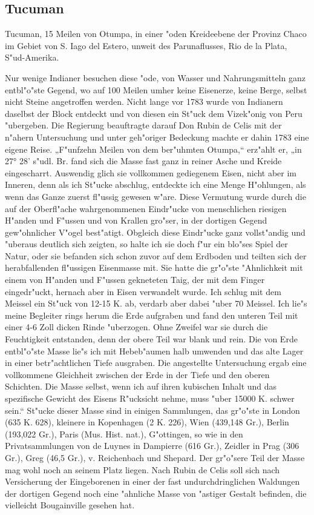 \documentclass[a4paper, 11pt, oneside]{article}
\begin{document}
\subsection{Tucuman}

Tucuman, 15 Meilen von Otumpa, in einer "oden Kreideebene
der Provinz Chaco im Gebiet von S. Iago del Estero, unweit des Parunaflusses, Rio de la Plata, S"ud-Amerika.

Nur wenige Indianer besuchen diese "ode, von Wasser und Nahrungsmitteln ganz entbl"o"ste Gegend, wo auf 100 Meilen umher keine Eisenerze, keine Berge, selbst nicht Steine angetroffen werden. Nicht lange vor 1783 wurde von Indianern daselbst der Block entdeckt und von diesen ein St"uck dem Vizek"onig von Peru "ubergeben. Die Regierung beauftragte darauf Don Rubin de Celis mit der n"ahern Untersuchung und unter geh"origer Bedeckung machte er dahin 1783 eine eigene Reise. „F"unfzehn Meilen von dem ber"uhmten Otumpa,“ erz"ahlt er, „in 27° 28' s"udl. Br. fand sich die Masse fast ganz in reiner Asche und Kreide eingescharrt. Auswendig glich sie vollkommen gediegenem Eisen, nicht aber im Inneren, denn als ich St"ucke abschlug, entdeckte ich eine Menge H"ohlungen, als wenn das Ganze zuerst fl"ussig gewesen w"are. Diese Vermutung wurde durch die auf der Oberfl"ache wahrgenommenen Eindr"ucke von menschlichen riesigen H"anden und F"ussen und von Krallen gro"ser, in der dortigen Gegend gew"ohnlicher V"ogel best"atigt. Obgleich diese Eindr"ucke ganz vollst"andig und "uberaus deutlich sich zeigten, so halte ich sie doch f"ur ein blo"ses Spiel der Natur, oder sie befanden sich schon zuvor auf dem Erdboden und teilten sich der herabfallenden fl"ussigen Eisenmasse mit. Sie hatte die gr"o"ste "Ahnlichkeit mit einem von H"anden und F"ussen gekneteten Taig, der mit dem Finger eingedr"uckt, hernach aber in Eisen verwandelt wurde. Ich schlug mit dem Meissel ein St"uck von 12-15 K. ab, verdarb aber dabei "uber 70 Meissel. Ich lie"s meine Begleiter rings herum die Erde aufgraben und fand den unteren Teil mit einer 4-6 Zoll dicken Rinde "uberzogen. Ohne Zweifel war sie durch die Feuchtigkeit entstanden, denn der obere Teil war blank und rein. Die von Erde entbl"o"ste Masse lie"s ich mit Hebeb"aumen halb umwenden und das alte Lager in einer betr"achtlichen Tiefe ausgraben. Die angestellte Untersuchung ergab eine vollkommene Gleichheit zwischen der Erde in der Tiefe und den oberen Schichten. Die Masse selbst, wenn ich auf ihren kubischen Inhalt und das spezifische Gewicht des Eisens R"ucksicht nehme, muss "uber 15000 K. schwer sein.“ St"ucke dieser Masse sind in einigen Sammlungen, das gr"o"ste in London (635 K. 628), kleinere in Kopenhagen (2 K. 226), Wien (439,148 Gr.), Berlin (193,022 Gr.), Paris (Mus. Hist. nat.), G"ottingen, so wie in den Privatsammlungen von de Luynes in Dampierre (616 Gr.), Zeidler in Prag (306 Gr.), Greg (46,5 Gr.), v. Reichenbach und Shepard. Der gr"o"sere Teil der Masse mag wohl noch an seinem Platz liegen. Nach Rubin de Celis soll sich nach Versicherung der Eingeborenen in einer der fast undurchdringlichen Waldungen der dortigen Gegend noch eine "ahnliche Masse von "astiger Gestalt befinden, die vielleicht Bougainville gesehen hat.
\end{document}
